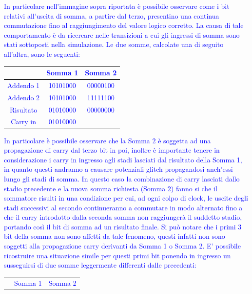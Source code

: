 \documentclass[11pt,  english, makeidx, a4paper, titlepage, oneside]{book}
\begin{document}
\textcolor{blue}{In particolare nell'immagine sopra riportata è possibile osservare come i bit relativi all'uscita di somma, a partire dal
terzo, presentino una continua commutazione fino al raggiungimento del valore logico corretto. La causa di tale comportamento è da ricercare
nelle transizioni a cui gli ingressi di somma sono stati sottoposti nella simulazione. Le due somme, calcolate una di seguito all'altra,
sono le seguenti:
\vspace{0.3cm}
\begin{center}
\begin{tabular}{|c|c|c|}
\hline
& Somma 1 & Somma 2 \\
\hline
Addendo 1 & 10101000 & 00000100\\
\hline
Addendo 2 & 10101000 & 11111100\\
\hline
Risultato & 01010000 & 00000000\\
\hline
Carry in & 01010000 & \\
\hline
\end{tabular}
\end{center}
\vspace{0.3cm}
In particolare è possibile osservare che la Somma 2 è soggetta ad una propagazione di carry dal terzo bit in poi, inoltre è importante tenere
in considerazione i carry in ingresso agli stadi lasciati dal risultato della Somma 1, in quanto questi andranno a causare potenziali glitch propagandosi anch'essi lungo gli stadi di somma. 
\vspace{0.3cm}
In questo caso la combinazione di carry lasciati dallo stadio precedente e la nuova somma richiesta (Somma 2) fanno si che il sommatore risulti in una condizione per cui, ad ogni colpo di clock, le uscite degli stadi successivi al secondo continueranno a commutare in modo alternato fino a che il carry introdotto dalla seconda somma non raggiungerà il suddetto stadio, portando così
il bit di somma ad un risultato finale. 
\vspace{0.3cm}
Si può notare che i primi 3 bit della somma non sono affetti da tale fenomeno, questi infatti non sono soggetti alla propagazione carry
derivanti da Somma 1 o Somma 2. E' possibile ricostruire una situazione simile per questi primi bit ponendo in ingresso un susseguirsi di due
somme leggermente differenti dalle precedenti:
\vspace{0.3cm}
\begin{center}
\begin{tabular}{|c|c|c|}
\hline
& Somma 1 & Somma 2 \\

\end{tabular}
\end{center}}
\end{document}
